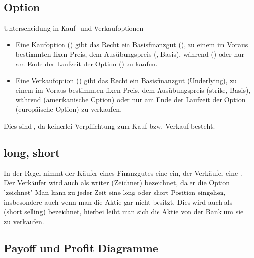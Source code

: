 \subsection{Option} %
\label{sub: option}
Unterscheidung in Kauf- und Verkaufoptionen
\begin{itemize}
	\item Eine Kaufoption () gibt das Recht ein Basisfinanzgut (), zu einem im Voraus bestimmten fixen Preis,
	dem Ausübungspreis (, Basis), während () oder nur am Ende der Laufzeit der Option () zu kaufen.
	\item  Eine Verkaufoption () gibt das Recht ein Basisfinanzgut (Underlying), zu einem im Voraus bestimmten fixen Preis, dem Ausübungspreis (strike, Basis), während (amerikanische Option) oder nur am Ende der Laufzeit der Option (europäische Option) zu verkaufen.
\end{itemize}
Dies sind  , da keinerlei Verpflichtung zum Kauf bzw. Verkauf besteht.


\subsection{long, short} %
\label{sub: long,_short}

In der Regel nimmt der Käufer eines Finanzgutes eine  ein, der Verkäufer eine .
Der Verkäufer wird auch als writer (Zeichner) bezeichnet, da er die Option 'zeichnet'. 
Man kann zu jeder Zeit eine long oder short Position eingehen, insbesondere auch wenn man die Aktie gar nicht besitzt. 
Dies wird auch als  (short selling) bezeichnet, hierbei leiht man sich die Aktie von der Bank um sie zu verkaufen.

\vfill


\subsection{Payoff und Profit Diagramme} %
\label{sub:payoff_und_profit_diagramme}


